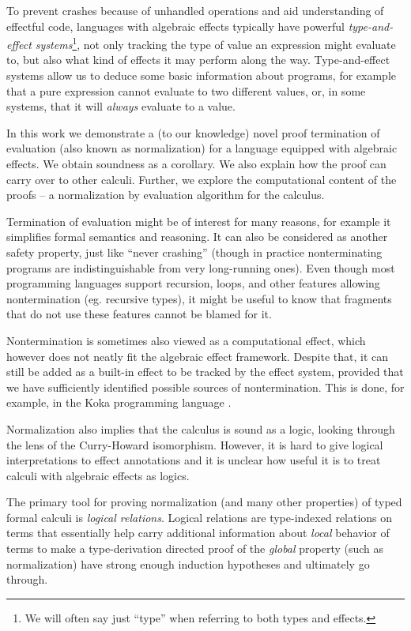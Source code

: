 \documentclass[a4paper, 12pt]{report}
\newcommand{\+}{\enspace}
\begin{document}
To prevent crashes because of unhandled operations and aid understanding of effectful code,
languages with algebraic effects typically have powerful
\textit{type-and-effect systems}\footnote{
We will often say just ``type'' when referring to both types and effects.},
not only tracking the type of value an expression might evaluate to, but also
what kind of effects it may perform along the way.
Type-and-effect systems allow us to deduce some basic information about programs,
for example that a pure expression cannot evaluate to two different values,
or, in some systems, that it will {\em always} evaluate to a value.

In this work we demonstrate a (to our knowledge) novel proof
termination of evaluation (also known as normalization) for a
 language equipped with algebraic effects.
We obtain soundness as a corollary.
We also explain how the proof can carry over to other calculi.
Further, we explore the computational content of the proofs –
a normalization by evaluation algorithm for the calculus.

Termination of evaluation might be of interest for many reasons,
for example it simplifies formal semantics and reasoning.
It can also be considered as another safety property, just like ``never crashing''
(though in practice nonterminating programs are indistinguishable from very long-running ones).
Even though most programming languages support recursion, loops, and other
features allowing nontermination (eg. recursive types),
it might be useful to know that fragments that do not use these features cannot be blamed
for it.

Nontermination is sometimes also viewed as a computational effect,
which however does not neatly fit the algebraic effect framework.
Despite that, it can still be added as a built-in effect to be tracked by
the effect system, provided that we have sufficiently identified possible sources
of nontermination.
This is done, for example, in the Koka programming language \cite{koka}.

Normalization also implies that the calculus is sound as a logic, %
looking through the lens of the Curry-Howard isomorphism.
However, it is hard to give logical interpretations to effect annotations \cite{oleg}
and it is unclear how useful it is to treat calculi with algebraic effects as logics.

The primary tool for proving normalization (and many other properties) of %
typed formal calculi is {\em logical relations}.
Logical relations are
type-indexed relations on terms that essentially help carry additional
information about {\em local} behavior of terms to make a type-derivation
directed proof of the {\em global} property (such as normalization)
have strong enough induction hypotheses and ultimately go through.
\end{document}
